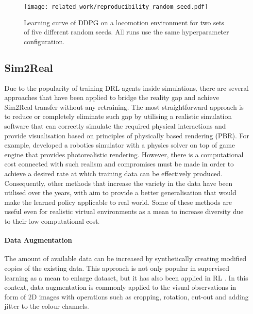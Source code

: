 \begin{figure}[hb]
    \centering
    \texttt{[image: related\_work/reproducibility\_random\_seed.pdf]}
    \caption{Learning curve of DDPG on a locomotion environment for two sets of five different random seeds. All runs use the same hyperparameter configuration. \protect\cite{henderson_deep_2018}}
    \label{fig:reproducibility_random_seed}
\end{figure}


\subsection{Sim2Real}\label{subsec:sim2real}

Due to the popularity of training DRL agents inside simulations, there are several approaches that have been applied to bridge the reality gap and achieve Sim2Real transfer without any retraining. The most straightforward approach is to reduce or completely eliminate such gap by utilising a realistic simulation software that can correctly simulate the required physical interactions and provide visualisation based on principles of physically based rendering (PBR). For example, \citet{iqbal_toward_2020} developed a robotics simulator with a physics solver on top of game engine that provides photorealistic rendering. However, there is a computational cost connected with such realism and compromises must be made in order to achieve a desired rate at which training data can be effectively produced. Consequently, other methods that increase the variety in the data have been utilised over the years, with aim to provide a better generalisation that would make the learned policy applicable to real world. Some of these methods are useful even for realistic virtual environments as a mean to increase diversity due to their low computational cost.

\paragraph{Data Augmentation} The amount of available data can be increased by synthetically creating modified copies of the existing data. This approach is not only popular in supervised learning as a mean to enlarge dataset, but it has also been applied in RL \cite{zhang_towards_2015, laskin_reinforcement_2020, zhan_framework_2020}. In this context, data augmentation is commonly applied to the visual observations in form of 2D images with operations such as cropping, rotation, cut-out and adding jitter to the colour channels.

